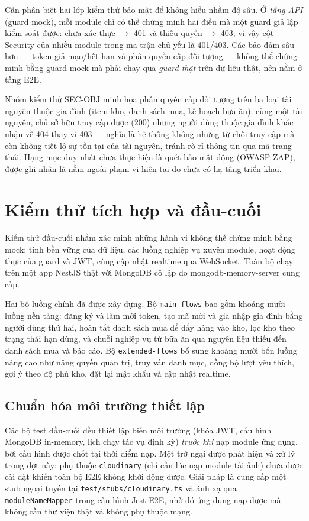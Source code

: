 \documentclass[12pt,a4paper]{article}
\newcommand{\code}[1]{\texttt{#1}}
\begin{document}
Cần phân biệt hai lớp kiểm thử bảo mật để không hiểu nhầm độ sâu. Ở \emph{tầng API} (guard mock), mỗi module
chỉ có thể chứng minh hai điều mà một guard giả lập kiểm soát được: chưa xác thực $\to$ 401 và thiếu quyền
$\to$ 403; vì vậy cột Security của nhiều module trong ma trận chủ yếu là 401/403. Các bảo đảm sâu hơn ---
token giả mạo/hết hạn và phân quyền cấp đối tượng --- không thể chứng minh bằng guard mock mà phải chạy qua
\emph{guard thật} trên dữ liệu thật, nên nằm ở tầng E2E.

Nhóm kiểm thử SEC-OBJ minh họa phân quyền cấp đối tượng trên ba loại tài nguyên thuộc gia đình (item kho,
danh sách mua, kế hoạch bữa ăn): cùng một tài nguyên, chủ sở hữu truy cập được (200) nhưng người dùng thuộc
gia đình khác nhận về 404 thay vì 403 --- nghĩa là hệ thống không những từ chối truy cập mà còn không tiết
lộ sự tồn tại của tài nguyên, tránh rò rỉ thông tin qua mã trạng thái. Hạng mục duy nhất chưa thực hiện là
quét bảo mật động (OWASP ZAP), được ghi nhận là nằm ngoài phạm vi hiện tại do chưa có hạ tầng triển khai.

\section{Kiểm thử tích hợp và đầu-cuối}

Kiểm thử đầu-cuối nhằm xác minh những hành vi không thể chứng minh bằng mock: tính bền vững của dữ liệu, các
luồng nghiệp vụ xuyên module, hoạt động thực của guard và JWT, cùng cập nhật realtime qua WebSocket. Toàn bộ
chạy trên một app NestJS thật với MongoDB cô lập do mongodb-memory-server cung cấp.

Hai bộ luồng chính đã được xây dựng. Bộ \code{main-flows} bao gồm khoảng mười luồng nền tảng: đăng ký và làm
mới token, tạo mã mời và gia nhập gia đình bằng người dùng thứ hai, hoàn tất danh sách mua để đẩy hàng vào
kho, lọc kho theo trạng thái hạn dùng, và chuỗi nghiệp vụ từ bữa ăn qua nguyên liệu thiếu đến danh sách mua
và báo cáo. Bộ \code{extended-flows} bổ sung khoảng mười bốn luồng nâng cao như nâng quyền quản trị, truy
vấn danh mục, đồng bộ lượt yêu thích, gợi ý theo độ phủ kho, đặt lại mật khẩu và cập nhật realtime.

\subsection{Chuẩn hóa môi trường thiết lập}

Các bộ test đầu-cuối đều thiết lập biến môi trường (khóa JWT, cấu hình MongoDB in-memory, lịch chạy tác vụ
định kỳ) \emph{trước khi} nạp module ứng dụng, bởi cấu hình được chốt tại thời điểm nạp. Một trở ngại được
phát hiện và xử lý trong đợt này: phụ thuộc \code{cloudinary} (chỉ cần lúc nạp module tải ảnh) chưa được cài
đặt khiến toàn bộ E2E không khởi động được. Giải pháp là cung cấp một stub ngoại tuyến tại
\code{test/stubs/cloudinary.ts} và ánh xạ qua \code{moduleNameMapper} trong cấu hình Jest E2E, nhờ đó ứng
dụng nạp được mà không cần thư viện thật và không phụ thuộc mạng.
\end{document}
